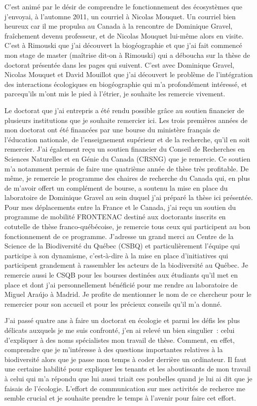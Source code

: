 C'est animé par le désir de comprendre le fonctionnement des écosystèmes
que j'envoyai, à l'automne 2011, un courriel à Nicolas Mouquet. Un
courriel bien heureux car il me propulsa au Canada à la rencontre de
Dominique Gravel, fraîchement devenu professeur, et de Nicolas Mouquet
lui-même alors en visite. C'est à Rimouski que j'ai découvert la
biogéographie et que j'ai fait commencé mon stage de master (maîtrise
dit-on à Rimouski) qui a déboucha sur la thèse de doctorat présentée
dans les pages qui suivent. C'est avec Dominique Gravel, Nicolas Mouquet
et David Mouillot que j'ai découvert le problème de l'intégration des
interactions écologiques en biogéographie qui m'a profondément
intéressé, et parcequ'ils m'ont mis le pied à l'étrier, je souhaite les
remercie vivement.

Le doctorat que j'ai entrepris a été rendu possible grâce au soutien
financier de plusieurs institutions que je souhaite remercier ici. Les
trois premières années de mon doctorat ont été financées par une bourse
du ministère français de l'éducation nationale, de l'enseignement
supérieur et de la recherche, qu'il en soit remercier. J'ai également
reçu un soutien financier du Conseil de Recherches en Sciences
Naturelles et en Génie du Canada (CRSNG) que je remercie. Ce soutien m'a
notamment permis de faire une quatrième année de thèse très profitable.
De même, je remercie le programme des chaires de recherche du Canada
qui, en plus de m'avoir offert un complément de bourse, a soutenu la
mise en place du laboratoire de Dominique Gravel au sein duquel j'ai
préparé la thèse ici présentée. Pour mes déplacements entre la France et
le Canada, j'ai reçu un soutien du programme de mobilité FRONTENAC
destiné aux doctorants inscrits en cotutelle de thèse franco-québécoise,
je remercie tous ceux qui participent au bon fonctionnement de ce
programme. J'adresse un grand merci au Centre de la Science de la
Biodiversité du Québec (CSBQ) et particulièrement l'équipe qui participe
à son dynamisme, c'est-à-dire à la mise en place d'initiatives qui
participent grandement à rassembler les acteurs de la biodiversité au
Québec. Je remercie aussi le CSQB pour les bourses destinées aux
étudiants qu'il met en place et dont j'ai personnellement bénéficié pour
me rendre au laboratoire de Miguel Araújo à Madrid. Je profite de
mentionner le nom de ce chercheur pour le remercier pour son accueil et
pour les précieux conseils qu'il m'a donné.

J'ai passé quatre ans à faire un doctorat en écologie et parmi les défis
les plus délicats auxquels je me suis confronté, j'en ai relevé un bien
singulier~: celui d'expliquer à des noms spécialistes mon travail de
thèse. Comment, en effet, comprendre que je m'intéresse à des questions
importantes relatives à la biodiversité alors que je passe mon temps à
coder derrière un ordinateur. Il faut une certaine habilité pour
expliquer les tenants et les aboutissants de mon travail à celui qui m'a
répondu que lui aussi triait ces poubelles quand je lui ai dit que je
faisais de l'écologie. L'effort de communication sur mes activités de
recherce me semble crucial et je souhaite prendre le temps à l'avenir
pour faire cet effort.

